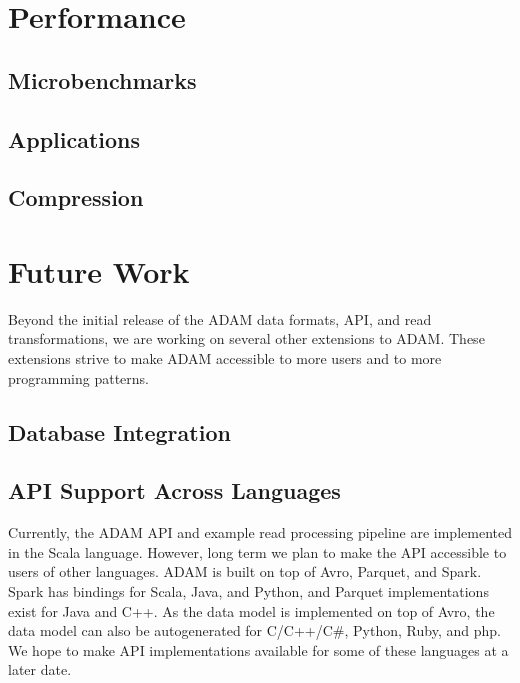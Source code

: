 \documentclass[10pt,twocolumn]{article}
\begin{document}
\section{Performance}
\label{sec:performance}

\subsection{Microbenchmarks}
\label{sec:microbenchmarks}

\subsection{Applications}
\label{sec:applications}

\subsection{Compression}
\label{sec:compression}

\section{Future Work}
\label{sec:future-work}

Beyond the initial release of the ADAM data formats, API, and read transformations, we are working on several other
extensions to ADAM. These extensions strive to make ADAM accessible to more users and to more programming patterns.

\subsection{Database Integration}
\label{sec:database-integration}

\subsection{API Support Across Languages}
\label{sec:api-support-across-languages}

Currently, the ADAM API and example read processing pipeline are implemented in the Scala language. However, long
term we plan to make the API accessible to users of other languages. ADAM is built on top of Avro, Parquet, and Spark.
Spark has bindings for Scala, Java, and Python, and Parquet implementations exist for Java and C++. As the data model
is implemented on top of Avro, the data model can also be auto\-generated for C/C++/C\#, Python, Ruby, and php. We hope
to make API implementations available for some of these languages at a later date.
\end{document}
